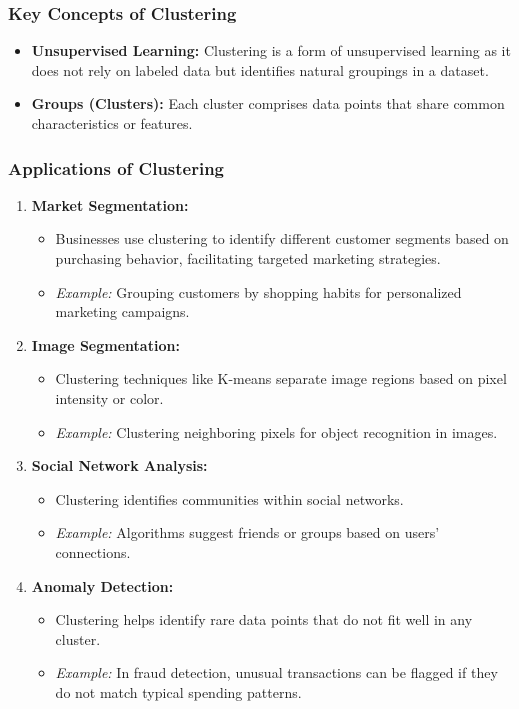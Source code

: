 \documentclass[aspectratio=169]{beamer}
\begin{document}
\begin{frame}[fragile]
    \frametitle{Key Concepts of Clustering}
    \begin{itemize}
        \item \textbf{Unsupervised Learning:} Clustering is a form of unsupervised learning as it does not rely on labeled data but identifies natural groupings in a dataset.
        \item \textbf{Groups (Clusters):} Each cluster comprises data points that share common characteristics or features.
    \end{itemize}
\end{frame}

\begin{frame}[fragile]
    \frametitle{Applications of Clustering}
    \begin{enumerate}
        \item \textbf{Market Segmentation:}
            \begin{itemize}
                \item Businesses use clustering to identify different customer segments based on purchasing behavior, facilitating targeted marketing strategies.
                \item \textit{Example:} Grouping customers by shopping habits for personalized marketing campaigns.
            \end{itemize}
        \item \textbf{Image Segmentation:}
            \begin{itemize}
                \item Clustering techniques like K-means separate image regions based on pixel intensity or color.
                \item \textit{Example:} Clustering neighboring pixels for object recognition in images.
            \end{itemize}
        \item \textbf{Social Network Analysis:}
            \begin{itemize}
                \item Clustering identifies communities within social networks.
                \item \textit{Example:} Algorithms suggest friends or groups based on users' connections.
            \end{itemize}
        \item \textbf{Anomaly Detection:}
            \begin{itemize}
                \item Clustering helps identify rare data points that do not fit well in any cluster.
                \item \textit{Example:} In fraud detection, unusual transactions can be flagged if they do not match typical spending patterns.
            \end{itemize}
    \end{enumerate}
\end{frame}
\end{document}
